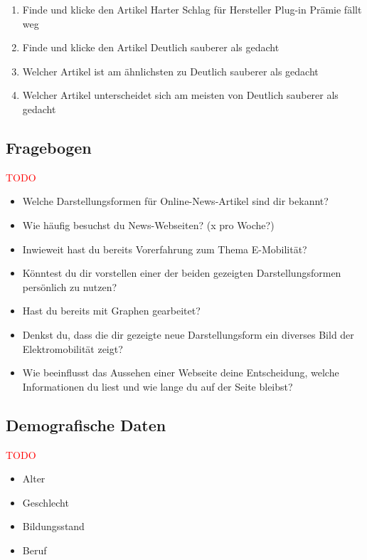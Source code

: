 \begin{enumerate}
    \item Finde und klicke den Artikel \glqq Harter Schlag für Hersteller Plug-in Prämie fällt weg\grqq{}
    \item Finde und klicke den Artikel \glqq Deutlich sauberer als gedacht\grqq{}
    \item Welcher Artikel ist am ähnlichsten zu \glqq Deutlich sauberer als gedacht\grqq{}
    \item Welcher Artikel unterscheidet sich am meisten von \glqq Deutlich sauberer als gedacht\grqq{}
\end{enumerate}

\subsection{Fragebogen}
\textcolor{red}{TODO}

\begin{itemize}
    \item Welche Darstellungsformen für Online-News-Artikel sind dir bekannt?
    \item Wie häufig besuchst du News-Webseiten? (x pro Woche?)
    \item Inwieweit hast du bereits Vorerfahrung zum Thema E-Mobilität?
    \item Könntest du dir vorstellen einer der beiden gezeigten Darstellungsformen persönlich zu nutzen?
    \item Hast du bereits mit Graphen gearbeitet?
    \item Denkst du, dass die dir gezeigte neue Darstellungsform ein diverses Bild der Elektromobilität zeigt?
    \item Wie beeinflusst das Aussehen einer Webseite deine Entscheidung, welche Informationen du liest und wie lange du auf der Seite bleibst?
\end{itemize}

\subsection{Demografische Daten}
\textcolor{red}{TODO}
\begin{itemize}
    \item Alter
    \item Geschlecht
    \item Bildungsstand
    \item Beruf
\end{itemize}